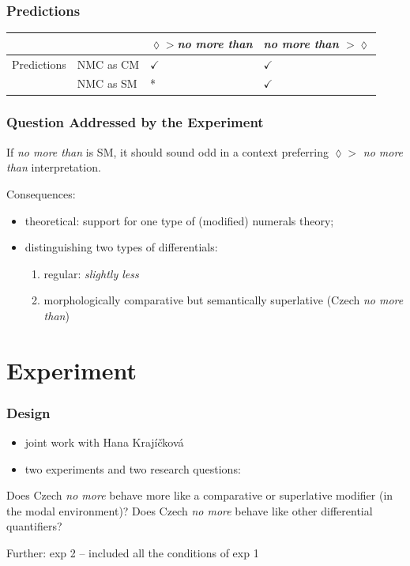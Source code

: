 \documentclass[10pt
]{beamer}
\begin{document}
\begin{frame}
  \frametitle{Predictions}

  \begin{longtable}[]{@{}llll@{}}
    \toprule
    & & $\lozenge >$\textit{no more than} & \textit{no more than} $> \lozenge$ \\
    \midrule
    \endhead
    Predictions & NMC as CM & \(\checkmark\) & \(\checkmark\) \\
    & NMC as SM & * & \(\checkmark\) \\
    \bottomrule
    \end{longtable}
  

\end{frame}

\begin{frame}
  \frametitle{Question Addressed by the Experiment}

  \ex If \textit{no more than} is SM, it should sound odd in a context preferring $\lozenge > $ \textit{no more than} interpretation.
  \xe
  
Consequences:

\begin{itemize}
  \item theoretical: support for one type of (modified) numerals theory;
  \item distinguishing two types of differentials:
    \begin{enumerate}
      \item regular: \textit{slightly less}
      \item morphologically comparative but semantically superlative (Czech \textit{no more than})
    \end{enumerate}  
\end{itemize}

\end{frame}

\section{Experiment}

\begin{frame}
  \frametitle{Design}

\begin{itemize}
  \item joint work with Hana Krajíčková
  \item two experiments and two research questions:  
\end{itemize}
  
\pex \a Does Czech \textit{no more} behave more like a comparative or superlative modifier (in the modal environment)? 
\a Does Czech \textit{no more} behave like other differential quantifiers?
\xe

Further: exp 2 -- included all the conditions of exp 1

\end{frame}
\end{document}
